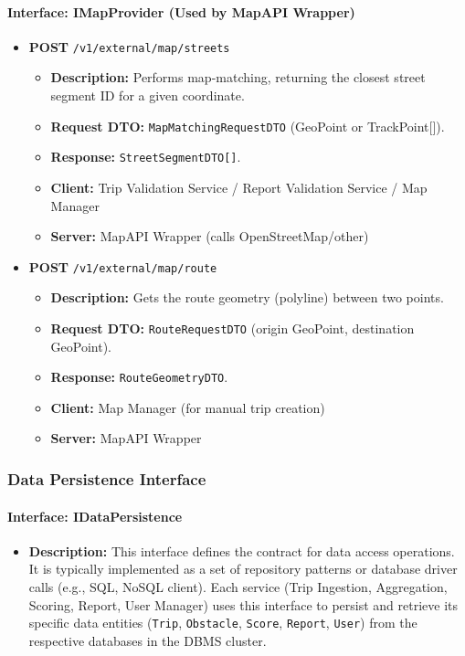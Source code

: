 \paragraph{Interface: IMapProvider (Used by MapAPI Wrapper)}
\begin{itemize}
    \item \textbf{POST} \texttt{/v1/external/map/streets}
    \begin{itemize}
        \item \textbf{Description:} Performs map-matching, returning the closest street segment ID for a given coordinate.
        \item \textbf{Request DTO:} \texttt{MapMatchingRequestDTO} (GeoPoint or TrackPoint[]).
        \item \textbf{Response:} \texttt{StreetSegmentDTO[]}.
        \item \textbf{Client:} Trip Validation Service / Report Validation Service / Map Manager
        \item \textbf{Server:} MapAPI Wrapper (calls OpenStreetMap/other)
    \end{itemize}
    
    \item \textbf{POST} \texttt{/v1/external/map/route}
    \begin{itemize}
        \item \textbf{Description:} Gets the route geometry (polyline) between two points.
        \item \textbf{Request DTO:} \texttt{RouteRequestDTO} (origin GeoPoint, destination GeoPoint).
        \item \textbf{Response:} \texttt{RouteGeometryDTO}.
        \item \textbf{Client:} Map Manager (for manual trip creation)
        \item \textbf{Server:} MapAPI Wrapper
    \end{itemize}
\end{itemize}

\subsubsection{Data Persistence Interface}
\paragraph{Interface: IDataPersistence}
\begin{itemize}
    \item \textbf{Description:} This interface defines the contract for data access operations. It is typically implemented as a set of repository patterns or database driver calls (e.g., SQL, NoSQL client). Each service (Trip Ingestion, Aggregation, Scoring, Report, User Manager) uses this interface to persist and retrieve its specific data entities (\texttt{Trip}, \texttt{Obstacle}, \texttt{Score}, \texttt{Report}, \texttt{User}) from the respective databases in the DBMS cluster.
\end{itemize}


